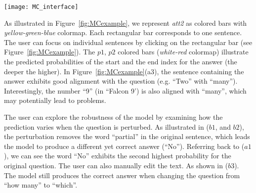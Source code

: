 \begin{figure*}[t]
\centering
\vspace{-2mm}
 \texttt{[image: MC\_interface]}
  \vspace{-7mm}
 \caption{
In the machine comprehension visualization interface (a), the $p1$, $p2$ colored bar (in $a3$) illustrates the predicted start and end index of the answer in the context (the deeper the red, the higher the probability). The most likely answer is shown in ($a1$). The global and local attention are visualized by ($a2$, $a3$).
%
We can evaluate the robustness of the prediction by perturbing the question sentence ($b1$, $b3$). As illustrated in ($b1$, $b2$) by removing the word ``partial'', the model still finds the correct answer (albeit different, as the sentence perturbation changes the exact meaning of the question). 
}
\label{fig:MCexample}
\end{figure*}

As illustrated in Figure~\ref{fig:MCexample}, we represent \emph{att2} as colored bars with \emph{yellow-green-blue} colormap. Each rectangular bar corresponds to one sentence. The user can focus on individual sentences by clicking on the rectangular bar (see Figure~\ref{fig:MCexample}).
The $p1$, $p2$ colored bars (\emph{white-red} colormap) illustrate the predicted probabilities of the start and the end index for the answer (the deeper the higher). %
%
In Figure~\ref{fig:MCexample}(a3), the sentence containing the answer exhibits good alignment with the question (e.g. ``Two'' with ``many'').
Interestingly, the number ``9'' (in ``Falcon 9') is also aligned with ``many'', which may potentially lead to problems.

The user can explore the robustness of the model by examining how the prediction varies when the question is perturbed.
%
As illustrated in ($b1$, and $b2$), the perturbation removes the word ``partial'' in the original sentence, which leads the model to produce a different yet correct answer (``No''). Referring back to ($a1$), we can see the word ``No'' exhibits the second highest probability for the original question.
%
The user can also manually edit the text. As shown in ($b3$). The model still produces the correct answer when changing the question from ``how many'' to ``which''.

